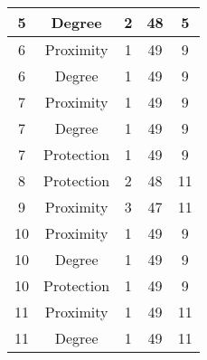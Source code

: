 \documentclass[results.tex]{subfiles}
\begin{document}
\begin{center}
\begin{tabular}{| c || c | c | c | c |}
            \hline
            5                       & Degree                       & 2                      & 48                      & 5                    \\
            \hline
            6                       & Proximity                    & 1                      & 49                      & 9                    \\
            \hline
            6                       & Degree                       & 1                      & 49                      & 9                    \\
            \hline
            7                       & Proximity                    & 1                      & 49                      & 9                    \\
            \hline
            7                       & Degree                       & 1                      & 49                      & 9                    \\
            \hline
            7                       & Protection                   & 1                      & 49                      & 9                    \\
            \hline
            8                       & Protection                   & 2                      & 48                      & 11                   \\
            \hline
            9                       & Proximity                    & 3                      & 47                      & 11                   \\
            \hline
            10                      & Proximity                    & 1                      & 49                      & 9                    \\
            \hline
            10                      & Degree                       & 1                      & 49                      & 9                    \\
            \hline
            10                      & Protection                   & 1                      & 49                      & 9                    \\
            \hline
            11                      & Proximity                    & 1                      & 49                      & 11                   \\
            \hline
            11                      & Degree                       & 1                      & 49                      & 11                   \\

\end{tabular}
\end{center}
\end{document}
